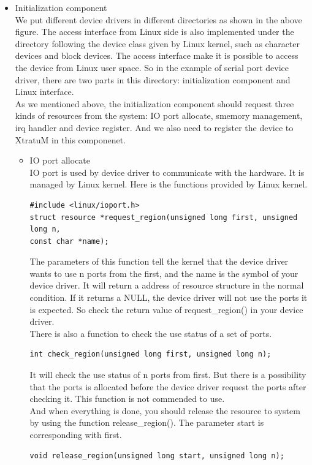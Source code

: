 \begin{itemize}
\item{Initialization component}
\\
We put different device drivers in different directories as shown in the above figure. The access interface from Linux side is also implemented under the directory following the device class given by Linux kernel, such as character devices and block devices. The access interface make it is possible to access the device from Linux user space. So in the example of serial port device driver, there are two parts in this directory: initialization component and Linux interface.
\\
As we mentioned above, the initialization component should request three kinds of resources from the system: I\/O port allocate, smemory management, irq handler and device register. And we also need to register the device to XtratuM in this componenet.

\begin{itemize}
\item{I\/O port allocate}
\\
I\/O port is used by device driver to communicate with the hardware. It is managed by Linux kernel. Here is the functions provided by Linux kernel.
\begin{verbatim}
#include <linux/ioport.h>
struct resource *request_region(unsigned long first, unsigned long n,
const char *name);
\end{verbatim}

The parameters of this function tell the kernel that the device driver wants to use n ports from the first, and the name is the symbol of your device driver. It will return a address of resource structure in the normal condition. If it returns a NULL, the device driver will not use the ports it is expected. So check the return value of request\_region() in your device driver.
\\
There is also a function to check the use status of a set of ports.
\begin{verbatim}
int check_region(unsigned long first, unsigned long n);
\end{verbatim}
It will check the use status of n ports from first. But there is a possibility that the ports is allocated before the device driver request the ports after checking it. This function is not commended to use.\\
And when everything is done, you should release the resource to system by using the function release\_region(). The parameter start is corresponding with first.
\begin{verbatim}
void release_region(unsigned long start, unsigned long n);
\end{verbatim}


\end{itemize}
\end{itemize}
